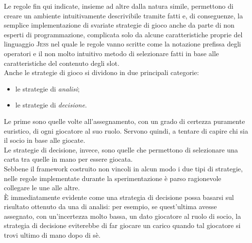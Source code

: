 Le regole fin qui indicate, insieme ad altre dalla natura simile, permettono di creare un ambiente intuitivamente descrivibile tramite fatti e, di conseguenze, la semplice implementazione di svariate strategie di gioco anche da parte di non esperti di programmazione, complicata solo da alcune caratteristiche proprie del linguaggio \textsc{Jess} nel quale le regole vanno scritte come la notazione prefissa degli operatori e il non molto intuitivo metodo di selezionare fatti in base alle caratteristiche del contenuto degli slot.\\
Anche le strategie di gioco si dividono in due principali categorie:
\begin{itemize}
   \item le strategie di \emph{analisi};
   \item le strategie di \emph{decisione}.
\end{itemize}

Le prime sono quelle volte all'assegnamento, con un grado di certezza puramente euristico, di ogni giocatore al suo ruolo.
Servono quindi, a tentare di capire chi sia il socio in base alle giocate.\\
Le strategie di decisione, invece, sono quelle che permettono di selezionare una carta tra quelle in mano per essere giocata.\\
Sebbene il framework costruito non vincoli in alcun modo i due tipi di strategie, nelle regole implementate durante la sperimentazione  è parso ragionevole collegare le une alle altre.\\
È immediatamente evidente come una strategia di decisione possa basarsi sul risultato ottenuto da una di analisi: per esempio, se quest'ultima avesse assegnato, con un'incertezza molto bassa, un dato giocatore al ruolo di socio, la strategia di decisione eviterebbe di far giocare un carico quando tal giocatore si trovi ultimo di mano dopo di sè.\\

